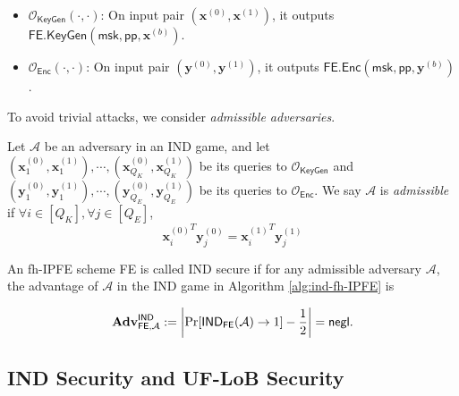 \begin{itemize}

	\item $\mathcal{O}_{\textsf{KeyGen}}(\cdot, \cdot)$: On input pair $(\mathbf{x}^{(0)}, \mathbf{x}^{(1)})$, it outputs $\textsf{FE.KeyGen}(\textsf{msk}, \textsf{pp}, \mathbf{x}^{(b)} )$.

	\item $\mathcal{O}_{\textsf{Enc}}(\cdot, \cdot)$: On input pair $(\mathbf{y}^{(0)}, \mathbf{y}^{(1)})$, it outputs $\textsf{FE.Enc}(\textsf{msk}, \textsf{pp}, \mathbf{y}^{(b)} )$.

\end{itemize}

\noindent To avoid trivial attacks, we consider \emph{admissible adversaries}.

\begin{definition}

	Let $\mathcal{A}$ be an adversary in an \textsf{IND} game, and let $ (\mathbf{x}_1^{(0)}, \mathbf{x}_1^{(1)}), \cdots, (\mathbf{x}_{Q_K}^{(0)}, \mathbf{x}_{Q_K}^{(1)})$ be its queries to $\mathcal{O}_{\textsf{KeyGen}}$ and $(\mathbf{y}_1^{(0)}, \mathbf{y}_1^{(1)}), \cdots, (\mathbf{y}_{Q_E}^{(0)}, \mathbf{y}_{Q_E}^{(1)})$ be its queries to $\mathcal{O}_{\textsf{Enc}}$.
	We say $\mathcal{A}$ is \emph{admissible} if $\forall i \in [Q_K], \forall j \in [Q_E]$,
\[
	{\mathbf{x}^{(0)}_{i}}^T \mathbf{y}^{(0)}_{j} = {\mathbf{x}^{(1)}_{i}}^T \mathbf{y}^{(1)}_{j}
\]

\end{definition}



\begin{definition}

	An fh-IPFE scheme \textsf{FE} is called IND secure if for any admissible adversary $\mathcal{A}$, the advantage of $\mathcal{A}$ in the IND game in Algorithm \ref{alg:ind-fh-IPFE} is

\[
	\mathbf{Adv}_{\textsf{FE}, \mathcal{A}}^{\textsf{IND}} := \left| \Pr[\textsf{IND}_{\textsf{FE}}(\mathcal{A}) \to 1 ] - \frac{1}{2} \right| = \mathsf{negl}.
\]

\end{definition}


\subsection{IND Security and UF-LoB Security}
\label{sec:ind-uf-lob}

